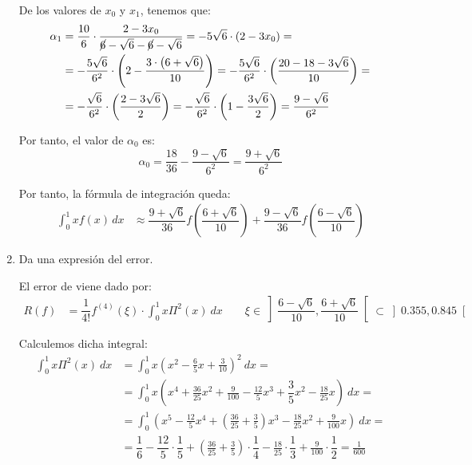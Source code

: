 \begin{ejercicio}
\begin{enumerate}
        De los valores de $x_0$ y $x_1$, tenemos que:
        \begin{align*}
            \alpha_1 &= \dfrac{10}{6}\cdot \dfrac{2-3x_0}{\cancel{6}-\sqrt{6}-\cancel{6}-\sqrt{6}}
            = -{5}\sqrt{6}\cdot \left(2-3x_0\right)
            = \\&= -\dfrac{5\sqrt{6}}{6^2}\cdot \left(2-\dfrac{3\cdot\left(6+\sqrt{6}\right)}{10}\right)
            = -\dfrac{5\sqrt{6}}{6^2}\cdot \left(\dfrac{20-18-3\sqrt{6}}{10}\right)
            =\\&= -\dfrac{\sqrt{6}}{6^2}\cdot \left(\dfrac{2-3\sqrt{6}}{2}\right)
            = -\dfrac{\sqrt{6}}{6^2}\cdot \left(1-\dfrac{3\sqrt{6}}{2}\right)
            = \dfrac{9-\sqrt{6}}{6^2}
        \end{align*}

        Por tanto, el valor de $\alpha_0$ es:
        \begin{equation*}
            \alpha_0 = \dfrac{18}{36}-\dfrac{9-\sqrt{6}}{6^2} = \dfrac{9+\sqrt{6}}{6^2}
        \end{equation*}

        Por tanto, la fórmula de integración queda:
        \begin{align*}
            \int_0^1 xf(x) \, dx &\approx \dfrac{9+\sqrt{6}}{36}f\left(\dfrac{6+\sqrt{6}}{10}\right) + \dfrac{9-\sqrt{6}}{36}f\left(\dfrac{6-\sqrt{6}}{10}\right)
        \end{align*}

        \item Da una expresión del error.
        
        El error de viene dado por:
        \begin{align*}
            R(f) &= \dfrac{1}{4!}f^{(4)}(\xi)\cdot \int_0^1 x\Pi^2(x)\ dx\qquad \xi\in \left]\dfrac{6-\sqrt{6}}{10},\dfrac{6+\sqrt{6}}{10}\right[\subset \left]0.355,0.845\right[
        \end{align*}

        Calculemos dicha integral:
        \begin{align*}
            \int_0^1 x\Pi^2(x)\ dx
            &= \int_0^1 x\left(x^2-\frac{6}{5}x+\frac{3}{10}\right)^2\ dx
            =\\&= \int_0^1 x\left(x^4+\frac{36}{25}x^2+\frac{9}{100}-\frac{12}{5}x^3+\dfrac{3}{5}x^2-\frac{18}{25}x\right)\ dx
            =\\&= \int_0^1 \left(x^5-\frac{12}{5}x^4+\left(\frac{36}{25}+\frac{3}{5}\right)x^3-\frac{18}{25}x^2+\frac{9}{100}x\right)\ dx
            =\\&= \dfrac{1}{6}-\dfrac{12}{5}\cdot \dfrac{1}{5}+\left(\frac{36}{25}+\frac{3}{5}\right)\cdot \dfrac{1}{4}-\frac{18}{25}\cdot \dfrac{1}{3}+\frac{9}{100}\cdot \dfrac{1}{2}
            = \frac{1}{600}
        \end{align*}


\end{enumerate}
\end{ejercicio}

